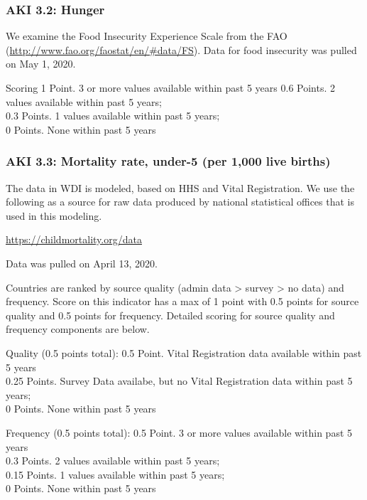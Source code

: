 \documentclass[]{article}
\begin{document}
\hypertarget{aki-3.2-hunger}{%
\subsubsection{AKI 3.2: Hunger}\label{aki-3.2-hunger}}

We examine the Food Insecurity Experience Scale from the FAO
(\url{http://www.fao.org/faostat/en/\#data/FS}). Data for food
insecurity was pulled on May 1, 2020.

Scoring 1 Point. 3 or more values available within past 5 years 0.6
Points. 2 values available within past 5 years;\\
0.3 Points. 1 values available within past 5 years;\\
0 Points. None within past 5 years

\hypertarget{aki-3.3-mortality-rate-under-5-per-1000-live-births}{%
\subsubsection{AKI 3.3: Mortality rate, under-5 (per 1,000 live
births)}\label{aki-3.3-mortality-rate-under-5-per-1000-live-births}}

The data in WDI is modeled, based on HHS and Vital Registration. We use
the following as a source for raw data produced by national statistical
offices that is used in this modeling.

\url{https://childmortality.org/data}

Data was pulled on April 13, 2020.

Countries are ranked by source quality (admin data \textgreater{} survey
\textgreater{} no data) and frequency. Score on this indicator has a max
of 1 point with 0.5 points for source quality and 0.5 points for
frequency. Detailed scoring for source quality and frequency components
are below.

Quality (0.5 points total): 0.5 Point. Vital Registration data available
within past 5 years\\
0.25 Points. Survey Data availabe, but no Vital Registration data within
past 5 years;\\
0 Points. None within past 5 years

Frequency (0.5 points total): 0.5 Point. 3 or more values available
within past 5 years\\
0.3 Points. 2 values available within past 5 years;\\
0.15 Points. 1 values available within past 5 years;\\
0 Points. None within past 5 years
\end{document}
